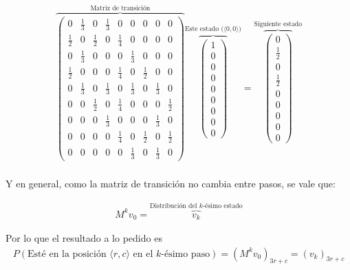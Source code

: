 \documentclass[../main.tex]{subfiles}
\begin{document}
\begin{gather*}
  \overbrace{\begin{pmatrix}
      0 & \frac{1}{3} & 0 & \frac{1}{3} & 0 & 0 & 0 & 0 & 0  \\
      \frac{1}{2} & 0 & \frac{1}{2} & 0 & \frac{1}{4} & 0 & 0 & 0 & 0  \\
      0 & \frac{1}{3} & 0 & 0 & 0 & \frac{1}{3} & 0 & 0 & 0  \\
      \frac{1}{2} & 0 & 0 & 0 & \frac{1}{4} & 0 & \frac{1}{2} & 0 & 0  \\
      0 & \frac{1}{3} & 0 & \frac{1}{3} & 0 & \frac{1}{3} & 0 & \frac{1}{3} & 0  \\
      0 & 0 & \frac{1}{2} & 0 & \frac{1}{4} & 0 & 0 & 0 & \frac{1}{2} \\
      0 & 0 & 0 & \frac{1}{3} & 0 & 0 & 0 & \frac{1}{3} & 0  \\
      0 & 0 & 0 & 0 & \frac{1}{4} & 0 & \frac{1}{2} & 0 & \frac{1}{2} \\
      0 & 0 & 0 & 0 & 0 & \frac{1}{3} & 0 & \frac{1}{3} & 0
  \end{pmatrix}}^{\text{Matriz de transición}}
  \overbrace{\begin{pmatrix}
      1 \\ 0 \\ 0 \\ 0 \\ 0 \\ 0 \\ 0 \\ 0 \\ 0 
  \end{pmatrix}}^{\text{Este estado (\(\langle 0, 0 \rangle\))}}
  =
  \overbrace{\begin{pmatrix}
      0 \\ \frac{1}{2} \\ 0 \\ \frac{1}{2} \\ 0 \\ 0 \\ 0 \\ 0 \\ 0 
  \end{pmatrix}}^{\text{Siguiente estado}}
\end{gather*}

\paragraph{} Y en general, como la matriz de transición no cambia entre pasos, se vale que:

\begin{gather*}
  M^{k} v_{0} = \overbrace{v_{k}}^{\text{Distribución del \(k\)-ésimo estado}}
\end{gather*} 

Por lo que el resultado a lo pedido es
\begin{gather*}
  P(\text{Esté en la posición } \langle r, c \rangle \text{ en el \(k\)-ésimo paso}) = (M^{k}v_{0})_{3r + c} = (v_{k})_{3r + c}
\end{gather*}
\end{document}
